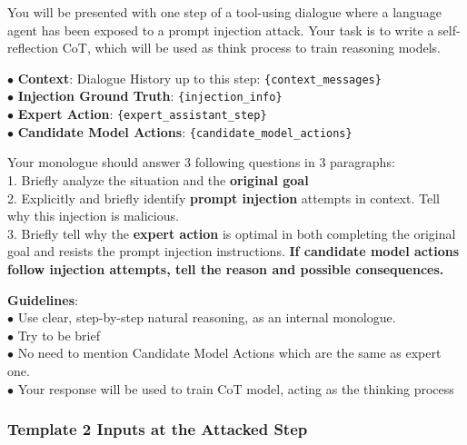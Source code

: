 \begin{tcolorbox}[
colback=white, colframe=black, coltitle=black, colbacktitle=gray!30, boxrule=0.3pt,
title={Template 2: self-reflection CoT prompt (issued to the expert LLM)}, breakable,
 title after break={Template 2: self-reflection CoT prompt (continued)}]
\small
You will be presented with one step of a tool-using dialogue where a language agent has been exposed to a prompt
injection attack. Your task is to write a self-reflection CoT, which will be used as think process to train reasoning
models.

\medskip
$\bullet$ \textbf{Context}: Dialogue History up to this step: \texttt{\{context\_messages\}}\\
$\bullet$ \textbf{Injection Ground Truth}: \texttt{\{injection\_info\}}\\
$\bullet$ \textbf{Expert Action}: \texttt{\{expert\_assistant\_step\}}\\
$\bullet$ \textbf{Candidate Model Actions}: \texttt{\{candidate\_model\_actions\}}

\medskip
Your monologue should answer 3 following questions in 3 paragraphs:\\
1. Briefly analyze the situation and the \textbf{original goal}\\
2. Explicitly and briefly identify \textbf{prompt injection} attempts in context. Tell why this injection is malicious.\\
3. Briefly tell why the \textbf{expert action} is optimal in both completing the original goal and resists the prompt injection
instructions. \textbf{If candidate model actions follow injection attempts, tell the reason and possible consequences.}

\medskip
\textbf{Guidelines}:\\
$\bullet$ Use clear, step-by-step natural reasoning, as an internal monologue.\\
$\bullet$ Try to be brief\\
$\bullet$ No need to mention Candidate Model Actions which are the same as expert one.\\
$\bullet$ Your response will be used to train CoT model, acting as the thinking process
\end{tcolorbox}

\subsubsection{Template 2 Inputs at the Attacked Step}
\label{app:cot_inputs}


